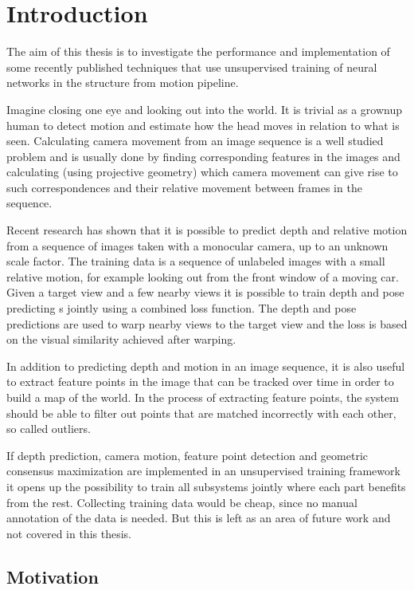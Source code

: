 \chapter{Introduction}\label{cha:introduction}

The aim of this thesis is to investigate the performance and implementation of some recently published techniques that use unsupervised training of neural networks in the structure from motion pipeline. 

Imagine closing one eye and looking out into the world. It is trivial as a grownup human to detect motion and estimate how the head moves in relation to what is seen. Calculating camera movement from an image sequence is a well studied problem and is usually done by finding corresponding features in the images and calculating (using projective geometry) which camera movement can give rise to such correspondences and their relative movement between frames in the sequence.

Recent research has shown that it is possible to predict depth and relative motion from a sequence of images taken with a monocular \abbrRGB camera, up to an unknown scale factor. The training data is a sequence of unlabeled images with a small relative motion, for example looking out from the front window of a moving car. Given a target view and a few nearby views it is possible to train depth and pose predicting \abbrCNN{}s jointly using a combined loss function. The depth and pose predictions are used to warp nearby views to the target view and the loss is based on the visual similarity achieved after warping.

In addition to predicting depth and motion in an image sequence, it is also useful to extract feature points in the image that can be tracked over time in order to build a map of the world. In the process of extracting feature points, the system should be able to filter out points that are matched incorrectly with each other, so called outliers.

If depth prediction, camera motion, feature point detection and geometric consensus maximization are implemented in an unsupervised training framework it opens up the possibility to train all subsystems jointly where each part benefits from the rest. Collecting training data would be cheap, since no manual annotation of the data is needed. But this is left as an area of future work and not covered in this thesis.

\section{Motivation}

